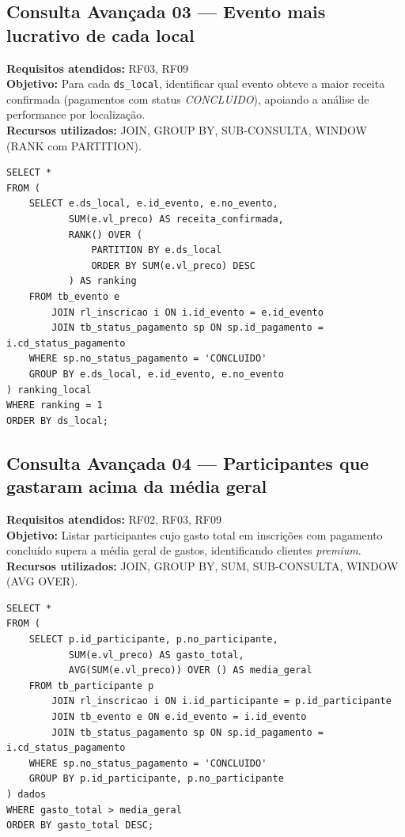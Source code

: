 \documentclass[12pt]{article}
\begin{document}
\subsection{Consulta Avançada 03 --- Evento mais lucrativo de cada local}
\textbf{Requisitos atendidos:} RF03, RF09 \\
\textbf{Objetivo:} Para cada \texttt{ds\_local}, identificar qual evento obteve a maior receita confirmada (pagamentos com status \textit{CONCLUIDO}), apoiando a análise de performance por localização. \\
\textbf{Recursos utilizados:} JOIN, GROUP BY, SUB-CONSULTA, WINDOW (RANK com PARTITION).
\begin{lstlisting}[caption={QA03 --- Evento mais lucrativo de cada local.}]
SELECT *
FROM (
    SELECT e.ds_local, e.id_evento, e.no_evento,
           SUM(e.vl_preco) AS receita_confirmada,
           RANK() OVER (
               PARTITION BY e.ds_local
               ORDER BY SUM(e.vl_preco) DESC
           ) AS ranking
    FROM tb_evento e
        JOIN rl_inscricao i ON i.id_evento = e.id_evento
        JOIN tb_status_pagamento sp ON sp.id_pagamento = i.cd_status_pagamento
    WHERE sp.no_status_pagamento = 'CONCLUIDO'
    GROUP BY e.ds_local, e.id_evento, e.no_evento
) ranking_local
WHERE ranking = 1
ORDER BY ds_local;
\end{lstlisting}

\subsection{Consulta Avançada 04 --- Participantes que gastaram acima da média geral}
\textbf{Requisitos atendidos:} RF02, RF03, RF09 \\
\textbf{Objetivo:} Listar participantes cujo gasto total em inscrições com pagamento concluído supera a média geral de gastos, identificando clientes \emph{premium}. \\
\textbf{Recursos utilizados:} JOIN, GROUP BY, SUM, SUB-CONSULTA, WINDOW (AVG OVER).
\begin{lstlisting}[caption={QA04 --- Participantes que gastaram acima da média geral.}]
SELECT *
FROM (
    SELECT p.id_participante, p.no_participante,
           SUM(e.vl_preco) AS gasto_total,
           AVG(SUM(e.vl_preco)) OVER () AS media_geral
    FROM tb_participante p
        JOIN rl_inscricao i ON i.id_participante = p.id_participante
        JOIN tb_evento e ON e.id_evento = i.id_evento
        JOIN tb_status_pagamento sp ON sp.id_pagamento = i.cd_status_pagamento
    WHERE sp.no_status_pagamento = 'CONCLUIDO'
    GROUP BY p.id_participante, p.no_participante
) dados
WHERE gasto_total > media_geral
ORDER BY gasto_total DESC;
\end{lstlisting}
\end{document}
